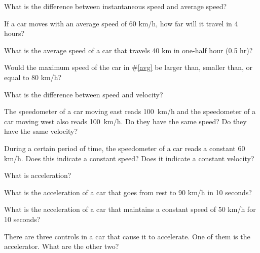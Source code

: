 \documentclass[10pt,landscape]{exam}
\begin{document}
\begin{multicols*}{2}

\begin{questions}


  \question 
    What is the difference between instantaneous speed and average speed? \vfill

  \question
    If a car moves with an average speed of 60 km/h, how far will it travel in 4 hours? \vfill

  \question
    What is the average speed of a car that travels 40 km in one-half hour (0.5 hr)? \label{avg} \vfill

  \question
    Would the maximum speed of the car in \#\ref{avg} be larger than, smaller than, or equal to 80 km/h? \vfill


  \question
    What is the difference between speed and velocity? \vfill

  \question
    The speedometer of a car moving east reads 100~km/h and the speedometer of a car moving west also reads 100~km/h.  Do they have the same speed?  Do they have the same velocity?
    \vfill

  \question
    During a certain period of time, the speedometer of a car reads a constant 60 km/h.  Does this indicate a constant speed?  Does it indicate a constant velocity?
    \vspace*{3em}

\columnbreak


  \question 
    What is acceleration? \vfill

  \question
    What is the acceleration of a car that goes from rest to 90 km/h in 10 seconds? \vfill

  \question
    What is the acceleration of a car that maintains a constant speed of 50 km/h for 10 seconds? \vfill

  \question
    There are three controls in a car that cause it to accelerate.  One of them is the accelerator.  What are the other two?
    \vspace*{7em}



\end{questions}

\end{multicols*}
\end{document}
